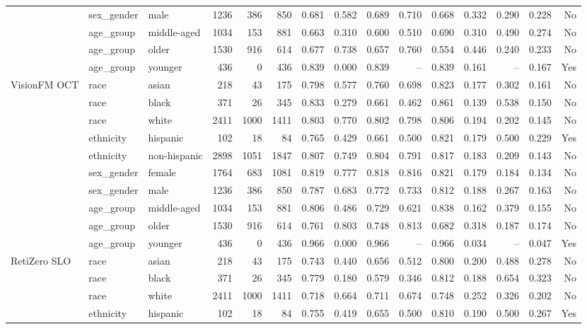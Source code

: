 \begin{longtable}{@{}lllrrrrrrrrrrrr@{}}
 & sex\_gender & male & 1236 & 386 & 850 & 0.681 & 0.582 & 0.689 & 0.710 & 0.668 & 0.332 & 0.290 & 0.228 & No \\
 & age\_group & middle-aged & 1034 & 153 & 881 & 0.663 & 0.310 & 0.600 & 0.510 & 0.690 & 0.310 & 0.490 & 0.274 & No \\
 & age\_group & older & 1530 & 916 & 614 & 0.677 & 0.738 & 0.657 & 0.760 & 0.554 & 0.446 & 0.240 & 0.233 & No \\
 & age\_group & younger & 436 & 0 & 436 & 0.839 & 0.000 & 0.839 & -- & 0.839 & 0.161 & -- & 0.167 & Yes \\
VisionFM OCT & race & asian & 218 & 43 & 175 & 0.798 & 0.577 & 0.760 & 0.698 & 0.823 & 0.177 & 0.302 & 0.161 & No \\
 & race & black & 371 & 26 & 345 & 0.833 & 0.279 & 0.661 & 0.462 & 0.861 & 0.139 & 0.538 & 0.150 & No \\
 & race & white & 2411 & 1000 & 1411 & 0.803 & 0.770 & 0.802 & 0.798 & 0.806 & 0.194 & 0.202 & 0.145 & No \\
 & ethnicity & hispanic & 102 & 18 & 84 & 0.765 & 0.429 & 0.661 & 0.500 & 0.821 & 0.179 & 0.500 & 0.229 & Yes \\
 & ethnicity & non-hispanic & 2898 & 1051 & 1847 & 0.807 & 0.749 & 0.804 & 0.791 & 0.817 & 0.183 & 0.209 & 0.143 & No \\
 & sex\_gender & female & 1764 & 683 & 1081 & 0.819 & 0.777 & 0.818 & 0.816 & 0.821 & 0.179 & 0.184 & 0.134 & No \\
 & sex\_gender & male & 1236 & 386 & 850 & 0.787 & 0.683 & 0.772 & 0.733 & 0.812 & 0.188 & 0.267 & 0.163 & No \\
 & age\_group & middle-aged & 1034 & 153 & 881 & 0.806 & 0.486 & 0.729 & 0.621 & 0.838 & 0.162 & 0.379 & 0.155 & No \\
 & age\_group & older & 1530 & 916 & 614 & 0.761 & 0.803 & 0.748 & 0.813 & 0.682 & 0.318 & 0.187 & 0.174 & No \\
 & age\_group & younger & 436 & 0 & 436 & 0.966 & 0.000 & 0.966 & -- & 0.966 & 0.034 & -- & 0.047 & Yes \\
RetiZero SLO & race & asian & 218 & 43 & 175 & 0.743 & 0.440 & 0.656 & 0.512 & 0.800 & 0.200 & 0.488 & 0.278 & No \\
 & race & black & 371 & 26 & 345 & 0.779 & 0.180 & 0.579 & 0.346 & 0.812 & 0.188 & 0.654 & 0.323 & No \\
 & race & white & 2411 & 1000 & 1411 & 0.718 & 0.664 & 0.711 & 0.674 & 0.748 & 0.252 & 0.326 & 0.202 & No \\
 & ethnicity & hispanic & 102 & 18 & 84 & 0.755 & 0.419 & 0.655 & 0.500 & 0.810 & 0.190 & 0.500 & 0.267 & Yes \\

\end{longtable}
